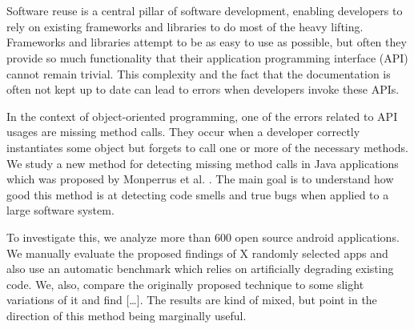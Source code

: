 \chapter{\abstractname}


Software reuse is a central pillar of software development, enabling developers to rely on existing frameworks and libraries to do most of the heavy lifting.
Frameworks and libraries attempt to be as easy to use as possible, but often they provide so much functionality that their application programming interface (API) cannot remain trivial.
This complexity and the fact that the documentation is often not kept up to date can lead to errors when developers invoke these APIs.

In the context of object-oriented programming, one of the errors related to API usages are missing method calls.
They occur when a developer correctly instantiates some object but forgets to call one or more of the necessary methods.
We study a new method for detecting missing method calls in Java applications which was proposed by Monperrus et al. \cite{monperrus2010detecting}.
The main goal is to understand how good this method is at detecting code smells and true bugs when applied to a large software system.

To investigate this, we analyze more than 600 open source android applications.
We manually evaluate the proposed findings of X randomly selected apps and also use an automatic benchmark which relies on artificially degrading existing code.
We, also, compare the originally proposed technique to some slight variations of it and find [\ldots].
The results are kind of mixed, but point in the direction of this method being marginally useful.
